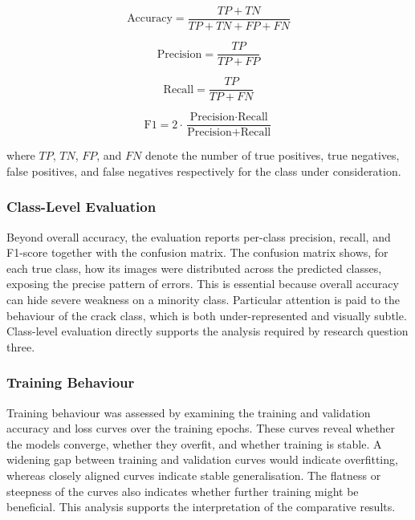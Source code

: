 \documentclass[preprint,12pt]{elsarticle}
\begin{document}
\begin{equation}
\text{Accuracy} = \frac{TP + TN}{TP + TN + FP + FN}
\label{eq:acc}
\end{equation}

\begin{equation}
\text{Precision} = \frac{TP}{TP + FP}
\label{eq:prec}
\end{equation}

\begin{equation}
\text{Recall} = \frac{TP}{TP + FN}
\label{eq:rec}
\end{equation}

\begin{equation}
\text{F1} = 2 \cdot \frac{\text{Precision} \cdot \text{Recall}}{\text{Precision} + \text{Recall}}
\label{eq:f1}
\end{equation}

\noindent
where $TP$, $TN$, $FP$, and $FN$ denote the number of true positives, true negatives, false positives, and false negatives respectively for the class under consideration.

\subsubsection{Class-Level Evaluation}

Beyond overall accuracy, the evaluation reports per-class precision, recall, and F1-score together with the confusion matrix.
The confusion matrix shows, for each true class, how its images were distributed across the predicted classes, exposing the precise pattern of errors.
This is essential because overall accuracy can hide severe weakness on a minority class.
Particular attention is paid to the behaviour of the crack class, which is both under-represented and visually subtle.
Class-level evaluation directly supports the analysis required by research question three.

\subsubsection{Training Behaviour}

Training behaviour was assessed by examining the training and validation accuracy and loss curves over the training epochs.
These curves reveal whether the models converge, whether they overfit, and whether training is stable.
A widening gap between training and validation curves would indicate overfitting, whereas closely aligned curves indicate stable generalisation.
The flatness or steepness of the curves also indicates whether further training might be beneficial.
This analysis supports the interpretation of the comparative results.
\end{document}
